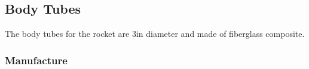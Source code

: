 \subsection{Body Tubes}

The body tubes for the rocket are 3in diameter and made of fiberglass composite.

\subsubsection{Manufacture}
